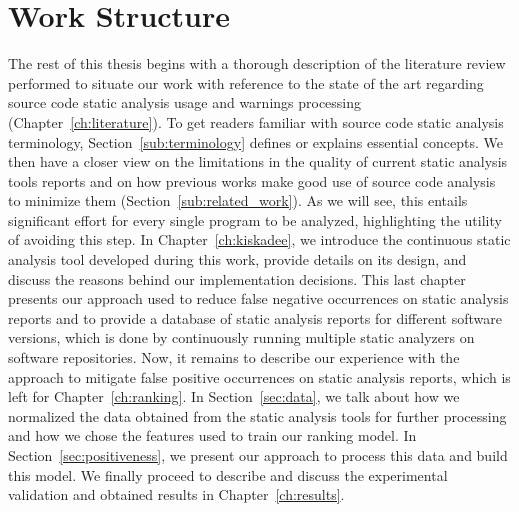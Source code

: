\section{Work Structure}
\label{sec:structure}

The rest of this thesis begins with a thorough description of the literature
review performed to situate our work with reference to the state of the art
regarding source code static analysis usage and warnings processing
(Chapter~\ref{ch:literature}). To get readers familiar with source code static analysis
terminology, Section~\ref{sub:terminology} defines or explains essential concepts. We
then have a closer view on the limitations in the quality of current static
analysis tools reports and on how previous works make good use of source code
analysis to minimize them (Section~\ref{sub:related_work}). As we will see, this entails
significant effort for every single program to be analyzed, highlighting the
utility of avoiding this step.  In Chapter~\ref{ch:kiskadee}, we introduce the continuous
static analysis tool developed during this work, provide details on its design,
and discuss the reasons behind our implementation decisions. This last
chapter presents our approach used to reduce false negative occurrences on
static analysis reports and to provide a database of static analysis reports for
different software versions, which is done by continuously running multiple
static analyzers on software repositories. Now, it remains to describe our
experience with the approach to mitigate false positive occurrences on static
analysis reports, which is left for Chapter~\ref{ch:ranking}. In Section~\ref{sec:data},
we talk about how we normalized the data obtained from the static analysis
tools for further processing and how we chose the features used to train our
ranking model. In Section~\ref{sec:positiveness}, we present our approach to
process this data and build this model. We finally proceed to describe and
discuss the experimental validation and obtained results in
Chapter~\ref{ch:results}.
